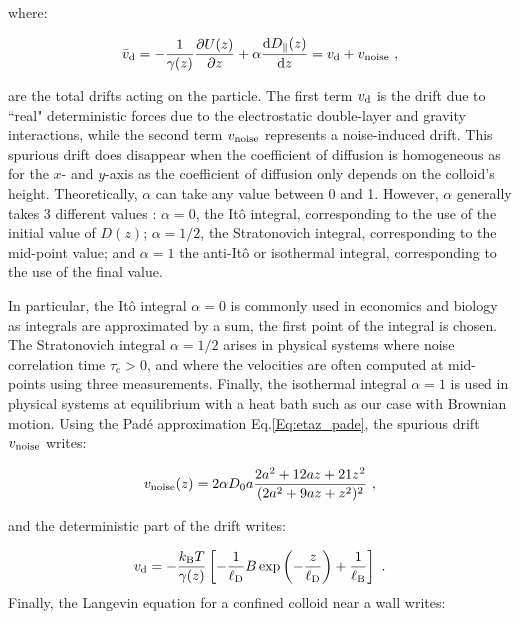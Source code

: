 where:

\begin{equation}
	\bar{v}_\textnormal{d} = - \frac{1}{\gamma(z)}\frac{\partial U(z)}{\partial z} +  \alpha  \frac{\textnormal{d} D_\parallel(z)}{\textnormal{d}z}  = v_\textnormal{d} + v_\textnormal{noise}~,
	\label{Eq.total_drifts}
\end{equation}

are the total drifts acting on the particle. The first term $v_\textnormal{d}$ is the drift  due to ``real" deterministic forces due to the electrostatic double-layer and gravity interactions, while the second term $ v_\textnormal{noise}$ represents a noise-induced drift. This spurious drift does disappear when the coefficient of diffusion is homogeneous as for the $x$- and $y$-axis as the coefficient of diffusion only depends on the colloid's height. Theoretically, $\alpha$ can take any value between 0 and 1. However, $\alpha$ generally takes 3 different values \cite{volpe_effective_2016}:  $\alpha = 0$, the Itô integral, corresponding to the use of the initial value of $D(z)$; $\alpha = 1/2$, the Stratonovich integral, corresponding to the mid-point value; and $\alpha = 1$ the anti-Itô or isothermal integral, corresponding to the use of the final value. 

In particular, the Itô integral $\alpha = 0$ is commonly used in economics and biology as integrals are approximated by a sum, the first point of the integral is chosen.  The Stratonovich integral $\alpha = 1/2$ arises in physical systems where noise correlation time $\tau _\mathrm{c} > 0$, and where the velocities are often computed at mid-points using three measurements. Finally, the isothermal integral $\alpha = 1$ is used in physical systems at equilibrium with a heat bath \cite{volpe_influence_2010} such as our case with Brownian motion. Using the Padé approximation Eq.\ref{Eq:etaz_pade}, the spurious drift $v_\textnormal{noise}$ writes:

\begin{equation}
	v_\textnormal{noise} (z)= 2 \alpha D_0 a\frac{2a^2 + 12 az + 21 z^2}{(2 a^2 + 9az + z^2) ^2} ~,
	\label{Eq.spurious_drift}
\end{equation}

and the deterministic part of the drift writes:

\begin{equation}
	v_\textnormal{d} =- \frac{k_\mathrm{B}T}{\gamma(z)} \left[- \frac{1}{\ell_\mathrm{D}} B \exp \left(- \frac{z}{\ell_\mathrm{D}}\right) + \frac{1}{\ell_\mathrm{B}}\right] ~.
\end{equation}
Finally, the Langevin equation for a confined colloid near a wall writes:


